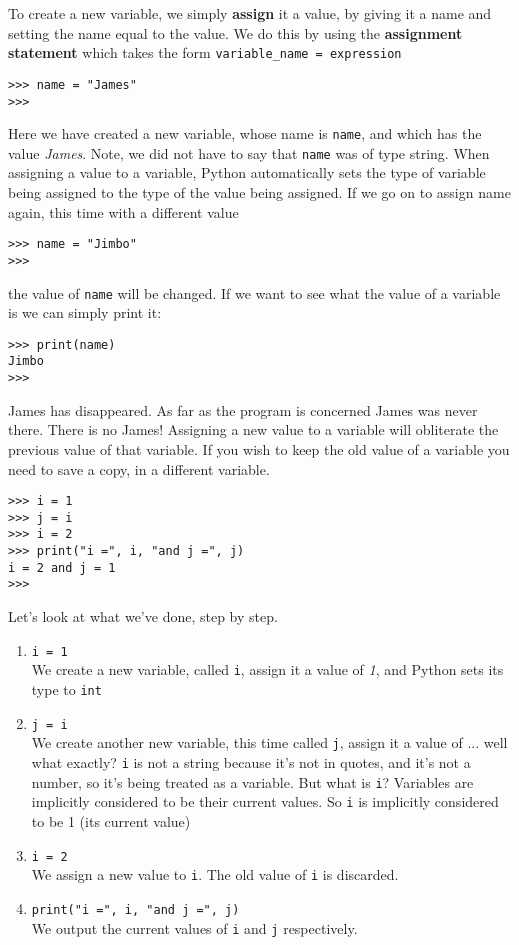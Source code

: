 To create a new variable, we simply \textbf{assign}   it a value, by giving it a name and setting the name equal to the   value. We do this by using the \textbf{assignment statement}   which takes the form \texttt{variable\_name = expression}
\begin{lstlisting}
>>> name = "James"
>>>
\end{lstlisting}

Here we have created a new variable, whose name is \texttt{name}, and which   has the value \textit{James}. Note, we did not have to say that \texttt{name} was of type string.   When assigning a value to a variable, Python automatically sets the type of   variable being assigned to the type of the value being assigned. If we   go on to assign name again, this time with a different value
\begin{lstlisting}
>>> name = "Jimbo"
>>>
\end{lstlisting}

the value of \texttt{name} will be changed. If we want to see what the value of   a variable is we can simply print it:
\begin{lstlisting}
>>> print(name)
Jimbo
>>>
\end{lstlisting}

James has disappeared. As far as the program is concerned James was   never there. There is no James! Assigning a new value to a variable   will obliterate the previous value of that variable. If you wish to   keep the old value of a variable you need to save a copy, in a   different variable.
\begin{lstlisting}
>>> i = 1
>>> j = i
>>> i = 2
>>> print("i =", i, "and j =", j)
i = 2 and j = 1
>>>
\end{lstlisting}

Let's look at what we've done, step by step.
\begin{enumerate}
	\item 
\texttt{i = 1}
\\     We create a new variable, called \texttt{i}, assign it a value of    \textit{1}, and Python sets its type to \texttt{int}
	\item 
\texttt{j = i}
\\     We create another new variable, this time called \texttt{j}, assign it a    value of ... well what exactly? 
\texttt{i} is not a string    because it's not in quotes, and it's not a number, so it's being    treated as a variable. But what is \texttt{i}? Variables are implicitly    considered to be their current values. So 
\texttt{i} is    implicitly considered to be 1 (its current value)
	\item 
\texttt{i = 2}
\\     We assign a new value to \texttt{i}. The old value of \texttt{i} is    discarded.
	\item 
\texttt{print("i =", i, "and j =", j)}
\\     We output the current values of \texttt{i} and \texttt{j} respectively.
\end{enumerate}

